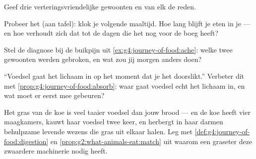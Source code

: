 \begin{exercise}[$\star$]\label{exo:g4:journey-of-food:7}
Geef drie verteringsvriendelijke gewoonten en van elk de reden.
\end{exercise}

\begin{exercise}[$\star$]\label{exo:g4:journey-of-food:8}
Probeer het (aan tafel): klok je volgende maaltijd. Hoe lang blijft je
eten in je  --- en hoe verhoudt zich dat tot de dagen die het nog
voor de boeg heeft?
\end{exercise}

\begin{exercise}[$\star\star$]\label{exo:g4:journey-of-food:9}
Stel de diagnose bij de buikpijn uit \cref{ex:g4:journey-of-food:ache}:
welke twee gewoonten werden gebroken, en wat zou jij morgen anders doen?
\end{exercise}

\begin{exercise}[$\star\star$]\label{exo:g4:journey-of-food:10}
``Voedsel gaat het lichaam in op het moment dat je het doorslikt.''
Verbeter dit met \cref{prop:g4:journey-of-food:absorb}: waar gaat
voedsel echt het lichaam in, en wat moet er eerst mee gebeuren?
\end{exercise}

\begin{exercise}[$\star\star\star$]\label{exo:g4:journey-of-food:11}
Het gras van de koe is veel taaier voedsel dan jouw brood --- en de koe
heeft vier maagkamers, kauwt haar voedsel twee keer, en herbergt in haar
darmen behulpzame levende wezens die gras uit elkaar halen. Leg met
\cref{def:g4:journey-of-food:digestion} en
\cref{prop:g2:what-animals-eat:match} uit waarom een graseter deze
zwaardere machinerie nodig heeft.
\end{exercise}
